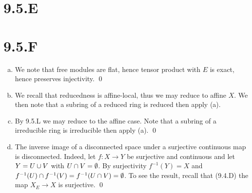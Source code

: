 \documentclass{article}
\begin{document}
\section{9.5.E}

\section{9.5.F}
\begin{enumerate}[a.]
    \item We note that free modules are flat, hence tensor product with
          $E$ is exact, hence preserves injectivity. \qed
    \item We recall that reducedness is affine-local, thus we may reduce to affine
          $X$. We then note that a subring of a reduced ring is reduced
          then apply (a).
    \item By 9.5.L we may reduce to the affine case. Note that a subring of a irreducible
          ring is irreducible then apply (a). \qed
    \item The inverse image of a disconnected space under a surjective continuous map is
          disconnected. Indeed, let $f: X \to Y$ be surjective and continuous
          and let $Y=U \cup V$ with $U \cap V = \emptyset$. By surjectivity
          $f^{-1}(Y)=X$ and $f^{-1}(U) \cap
              f^{-1}(V)=f^{-1}(U \cap V) = \emptyset$. To see the result, recall that
          (9.4.D) the map $X_E \to X$ is surjective. \qed
\end{enumerate}
\end{document}
